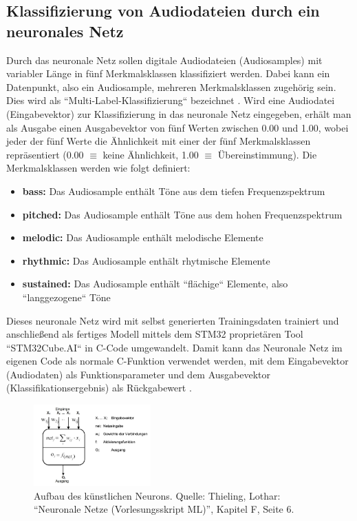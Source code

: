 \subsection{Klassifizierung von Audiodateien durch ein neuronales Netz}
\label{sec:classification-intro}
Durch das neuronale Netz sollen digitale Audiodateien (Audiosamples) mit variabler Länge in fünf Merkmalsklassen klassifiziert werden. Dabei kann ein Datenpunkt, also ein Audiosample, mehreren Merkmalsklassen zugehörig sein. Dies wird als ``Multi-Label-Klassifizierung`` bezeichnet \cite{multilabel-classification}. Wird eine Audiodatei (Eingabevektor) zur Klassifizierung in das neuronale Netz eingegeben, erhält man als Ausgabe einen Ausgabevektor von fünf Werten zwischen 0.00 und 1.00, wobei jeder der fünf Werte  die Ähnlichkeit mit einer der fünf Merkmalsklassen repräsentiert (0.00 $\equiv$ keine Ähnlichkeit, 1.00 $\equiv$ Übereinstimmung). Die Merkmalsklassen werden wie folgt definiert:

	\hypertarget{nn-classes}{}
    \begin{itemize}
        \item \textbf{bass:} Das Audiosample enthält Töne aus dem tiefen Frequenzspektrum
       	\item \textbf{pitched:} Das Audiosample enthält Töne aus dem hohen Frequenzspektrum
        \item \textbf{melodic:} Das Audiosample enthält melodische Elemente
        \item \textbf{rhythmic:} Das Audiosample enthält rhytmische Elemente
        \item \textbf{sustained:} Das Audiosample enthält ``flächige`` Elemente, also ``langgezogene`` Töne
    \end{itemize}

Dieses neuronale Netz wird mit selbst generierten Trainingsdaten trainiert und anschließend als fertiges Modell mittels dem STM32 proprietären Tool ``STM32Cube.AI`` in C-Code umgewandelt. Damit kann das Neuronale Netz im eigenen Code als normale C-Funktion verwendet werden, mit dem Eingabevektor (Audiodaten) als Funktionsparameter und dem Ausgabevektor (Klassifikationsergebnis) als Rückgabewert \cite{stm32-cube-ai-documentation}.

\begin{figure}
    \centering
    \includegraphics[width=0.4\textwidth]{images/08_durchfuehrung/nn/neuron-aufbau.png}
    \caption{Aufbau des künstlichen Neurons. Quelle: Thieling, Lothar: “Neuronale Netze (Vorlesungsskript ML)”, Kapitel F, Seite 6.}
    \label{fig:img-aufbau-neuron}
\end{figure}

